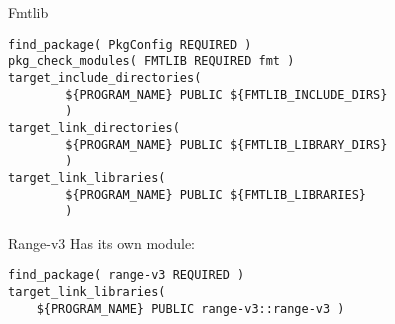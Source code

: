 \begin{numberedframe}{Fmtlib}
\begin{lstlisting}
find_package( PkgConfig REQUIRED )
pkg_check_modules( FMTLIB REQUIRED fmt )
target_include_directories(
        ${PROGRAM_NAME} PUBLIC ${FMTLIB_INCLUDE_DIRS}
        )
target_link_directories(
        ${PROGRAM_NAME} PUBLIC ${FMTLIB_LIBRARY_DIRS}
        )
target_link_libraries(
        ${PROGRAM_NAME} PUBLIC ${FMTLIB_LIBRARIES}
        )\end{lstlisting}
\end{numberedframe}

\begin{numberedframe}{Range-v3}
Has its own module:
\begin{lstlisting}
find_package( range-v3 REQUIRED )
target_link_libraries(
    ${PROGRAM_NAME} PUBLIC range-v3::range-v3 )
\end{lstlisting}
\end{numberedframe}

